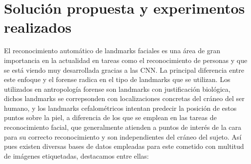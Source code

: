 \chapter{Solución propuesta y experimentos realizados}

    \noindent El reconocimiento automático de landmarks faciales es una área de gran importancia en la actualidad en tareas como el reconocimiento de personas y que se está viendo muy desarrollada gracias a las CNN. La principal diferencia entre este enfoque y el forense radica en el tipo de landmarks que se utilizan. Los utilizados en antropología forense son landmarks con justificación biológica, dichos landmarks se correpsonden con localizaciones concretas del cráneo del ser humano, y los landmarks cefalométricos intentan predecir la posición de estos puntos sobre la piel, a diferencia de los que se emplean en las tareas de reconocimiento facial, que generalmente atienden a puntos de interés de la cara para su correcto reconocimiento y son independientes del cráneo del sujeto. Así pues existen diversas bases de datos empleadas para este cometido con multitud de imágenes etiquetadas, destacamos entre ellas: 

